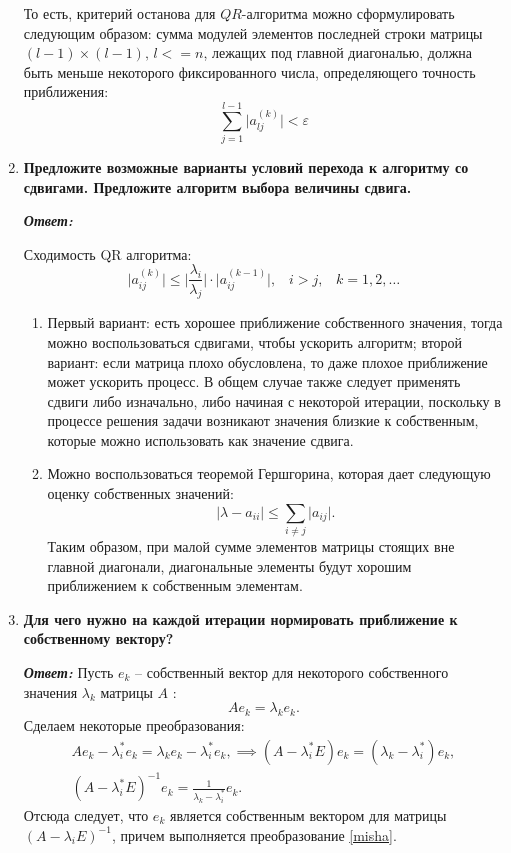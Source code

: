 \documentclass[12pt, a4paper]{article}
\newcommand{\abs}[1]{\lvert #1 \rvert}
\begin{document}
\begin{enumerate}
	То есть, критерий останова для $QR$-алгоритма можно сформулировать следующим образом: сумма модулей элементов последней строки матрицы $(l-1) \times (l-1), \, l <= n$, лежащих под главной диагональю, должна быть меньше некоторого фиксированного числа, определяющего точность приближения: \[ \sum_{j=1}^{l - 1} \abs{a^{(k)}_{l j}} < \varepsilon \]
	
	\item \textbf{ Предложите возможные варианты условий перехода к алгоритму со сдвигами. Предложите алгоритм выбора величины сдвига.}
	\vspace*{0.2cm}
	
	\textit{\textbf{Ответ:}}
	
	Сходимость QR алгоритма:
	\[
	\abs{a_{ij}^{(k)}} \le \abs{\dfrac{\lambda_i}{\lambda_j}}\cdot \abs{a_{ij}^{(k-1)}}, \;\;\; i > j, \;\;\; k = 1, 2, \ldots
	\]
	\begin{enumerate}
		\item
		Первый вариант: есть хорошее приближение собственного значения, тогда можно воспользоваться сдвигами, чтобы ускорить алгоритм; второй вариант: если матрица плохо обусловлена, то даже плохое приближение может ускорить процесс. В общем случае также следует применять сдвиги либо изначально, либо начиная с некоторой итерации, поскольку в процессе решения задачи возникают значения близкие к собственным, которые можно использовать как значение сдвига.  
		
		\item Можно воспользоваться теоремой Гершгорина, которая дает следующую оценку собственных значений:
		\[
		\abs{\lambda - a_{ii}} \le \sum\limits_{i \neq j}\abs{a_{ij}}.
		\] 
		Таким образом, при малой сумме элементов матрицы стоящих вне главной диагонали, диагональные элементы будут хорошим приближением к собственным элементам.   
	\end{enumerate}
	
	
	\item \textbf{Для чего нужно на каждой итерации нормировать приближение к собственному вектору?}
	\vspace*{0.2cm}
	
	\textit{\textbf{Ответ:}}
	Пусть $e_k$ -- собственный вектор для некоторого собственного значения $\lambda_k$ матрицы $A$ :
	$$
	Ae_k = \lambda_k e_k.
	$$
	Сделаем некоторые преобразования:
	\begin{gather}
		\nonumber Ae_k - \lambda^*_i e_k = \lambda_k e_k - \lambda^*_i e_k, \implies \left(A - \lambda^*_i E \right) e_k = (\lambda_k - \lambda^*_i) e_k, \\
		\label{misha}
		\left(A - \lambda^*_i E \right)^{-1} e_k = \frac 1 {\lambda_k - \lambda^*_i} e_k.
	\end{gather}
	Отсюда следует, что $e_k$ является собственным вектором для матрицы $\left(A - \lambda_i E\right)^{-1}$, причем выполняется преобразование \eqref{misha}.
	

\end{enumerate}
\end{document}
